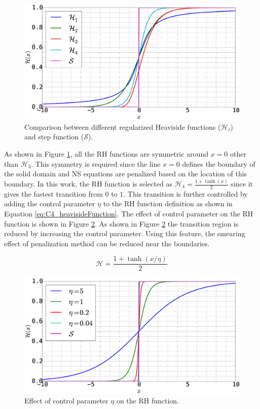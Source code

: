\begin{figure}[H]
    \centering
    \includegraphics[width=12.00cm]{Chapter_4/figure/heaviside_function_example.eps}
    \caption{Comparison between different regularized Heaviside functions ($\mathcal{H}_i$) and step function ($\mathcal{S}$).}
    \label{fig:C4_heavisideFunctionExample}
\end{figure}

As shown in Figure \ref{fig:C4_heavisideFunctionExample}, all the RH functions are symmetric around $x = 0$ other than $\mathcal{H}_3$. This symmetry is required since the line $x = 0$ defines the boundary of the solid domain and NS equations are penalized based on the location of this boundary. In this work, the RH function is selected as $\mathcal{H}_4 = \frac{1 + \tanh(x)}{2}$ since it gives the fastest transition from $0$ to $1$. This transition is further controlled by adding the control parameter $\eta$ to the RH function definition as shown in Equation \eqref{eq:C4_heavisideFunction}. The effect of control parameter on the RH function is shown in Figure \ref{fig:C4_heavisideFunctionWithControlParamter}. As shown in Figure \ref{fig:C4_heavisideFunctionWithControlParamter} the transition region is reduced by increasing the control parameter. Using this feature, the smearing effect of penalization method can be reduced near the boundaries.

\begin{equation}\label{eq:C4_heavisideFunction}
    \mathcal{H} = \frac{1 + \tanh(x / \eta)}{2}
\end{equation}

\begin{figure}[H]
    \centering
    \includegraphics[width=12.00cm]{Chapter_4/figure/heaviside_function_with_control.eps}
    \caption{Effect of control parameter $\eta$ on the RH function.}
    \label{fig:C4_heavisideFunctionWithControlParamter}
\end{figure}

